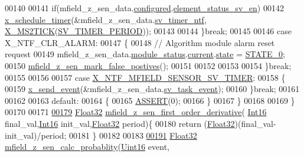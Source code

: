 \begin{DoxyCode}
00140 
00141               \textcolor{keywordflow}{if}(mfield\_z\_sen\_data.\hyperlink{a00027_a94b2d1f6ea4ab334c74d24984dd27843}{configured}.\hyperlink{a00021_afeb3f74725269028a60926f98890c22b}{element\_status\_sv\_en})
00142               \hyperlink{a00036_a9e3befaa21e83f196f74201deed85346}{x\_schedule\_timer}(&mfield\_z\_sen\_data.\hyperlink{a00027_ada91b200053f2d93e3639dc4ee3415b4}{sv\_timer\_ntf},
      \hyperlink{a00036_a1732cd929c486b3a225824bb2b3dba36}{X\_MS2TICK}(\hyperlink{a00023_a8a535456285f4602701c814d7b69cc68}{SV\_TIMER\_PERIOD}));
00143 
00144         \}\textcolor{keywordflow}{break};
00145 
00146          \textcolor{keywordflow}{case} X\_NTF\_CLR\_ALARM:
00147         \{
00148            \textcolor{comment}{// Algorithm module alarm reset request}
00149              mfield\_z\_sen\_data.\hyperlink{a00027_adfab5a5d8b45a93dfb13edb24e2b80e3}{module\_status}.\hyperlink{a00019_acf41ffc11da291c2f9f0fcb02ee72b98}{current}.\hyperlink{a00019_a6b8d8e916bc56265a3fd279bd26b6d1b}{state} = 
      \hyperlink{a00021_ad6739dbbe5581cac99b7dc8a5e09949c}{STATE\_0};
00150              \hyperlink{a00053_acd2adf617d062b1d3dfc9df79aa2ad32}{mfield\_z\_sen\_mark\_false\_postives}();
00151 
00152 
00153 
00154         \}\textcolor{keywordflow}{break};
00155 
00156 
00157         \textcolor{keywordflow}{case} \hyperlink{a00025_ad9eede821e7c65d58f1806af4bd6bf29}{X\_NTF\_MFIELD\_SENSOR\_SV\_TIMER}:
00158         \{
00159            \hyperlink{a00036_a4bc3d03c8d62c8237329ed4e969fbc1b}{x\_send\_event}(&mfield\_z\_sen\_data.\hyperlink{a00027_a43c345f39ea3aefbb60ef1ef57fe5d83}{sv\_task\_event});
00160         \}\textcolor{keywordflow}{break};
00161 
00162 
00163         \textcolor{keywordflow}{default}:
00164         \{
00165             \hyperlink{a00072_abb8ff8e213ac9f6fb21d2b968583b936}{ASSERT}(0);
00166         \}
00167     \}
00168 
00169 \}
00170 
00171 
\hypertarget{a00053_source_l00179}{}\hyperlink{a00053_a82939d05c14b8ab80cacc21b7a1b8d3e}{00179} \hyperlink{a00072_a87d38f886e617ced2698fc55afa07637}{Float32} \hyperlink{a00053_a82939d05c14b8ab80cacc21b7a1b8d3e}{mfield\_z\_sen\_first\_order\_derivative}(
      \hyperlink{a00072_a659ce9e5eb6571f9984ffc7caad2660a}{Int16} final\_val,\hyperlink{a00072_a659ce9e5eb6571f9984ffc7caad2660a}{Int16} init\_val,\hyperlink{a00072_a87d38f886e617ced2698fc55afa07637}{Float32} period)\{
00180     \textcolor{keywordflow}{return} (\hyperlink{a00072_a87d38f886e617ced2698fc55afa07637}{Float32})(final\_val-init\_val)/period;
00181 \}
00182 
00183 
\hypertarget{a00053_source_l00191}{}\hyperlink{a00053_a8a5c3986dbe778d199b6e3b485f7a34b}{00191} \hyperlink{a00072_a87d38f886e617ced2698fc55afa07637}{Float32} \hyperlink{a00053_a8a5c3986dbe778d199b6e3b485f7a34b}{mfield\_z\_sen\_calc\_probablity}(\hyperlink{a00072_a59a9f6be4562c327cbfb4f7e8e18f08b}{Uint16} event,

\end{DoxyCode}
